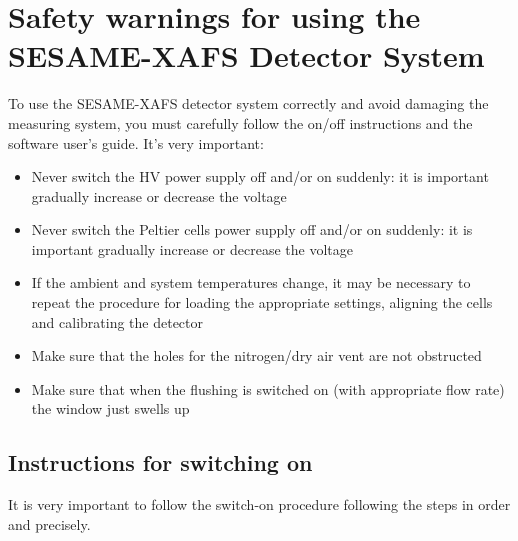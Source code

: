 \documentclass[a4paper,12pt,oneside,pdflatex,italian,final,twocolumn]{article}
\begin{document}
\clearpage

\section{Safety warnings for using the SESAME-XAFS Detector System} \label{sicurezza}
To use the SESAME-XAFS detector system correctly and avoid damaging the measuring system, you must carefully follow the on/off instructions and the software user's guide.
It's very important:
\begin{itemize}
    \item Never switch the HV power supply off and/or on suddenly: it is important gradually increase or decrease the voltage
    \item Never switch the Peltier cells power supply off and/or on suddenly: it is important gradually increase or decrease the voltage
    \item  If the ambient and system temperatures change, it may be necessary to repeat the procedure for loading the appropriate settings, aligning the cells and calibrating the detector
    \item Make sure that the holes for the nitrogen/dry air vent are not obstructed
    \item Make sure that when the flushing is switched on (with appropriate flow rate) the window just swells up
\end{itemize}

    \subsection{Instructions for switching on} \label{accensione}
  It is very important to follow the switch-on procedure following the steps in order and precisely.
    
\end{document}

